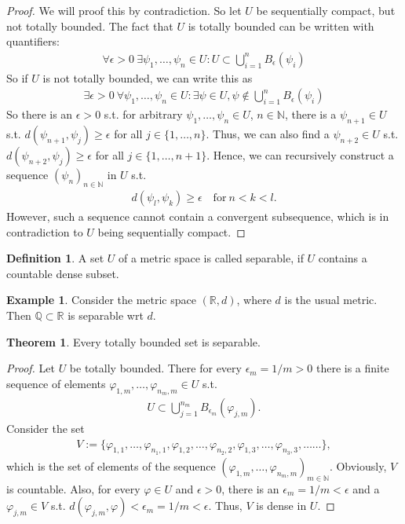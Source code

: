 \documentclass[12pt, a4paper]{article}
\numberwithin{equation}{section}
\theoremstyle{definition}
\theoremstyle{definition}
\newtheorem{defn}[thm]{Definition} %
\newtheorem{exmp}[thm]{Example} %
\newtheorem{theorem}[thm]{Theorem}
\newcommand{\seq}[1][\varphi]{\left( #1 \right)_{n \in \mathbb{N}}}
\begin{document}
	\begin{proof}
		We will proof this by contradiction. So let $U$ be sequentially compact, but not totally bounded. The fact that $U$ is totally bounded can be written with quantifiers:
		\begin{align*}
			\forall \epsilon > 0\ \exists \psi_1, \dots, \psi_n\in U: U\subset \bigcup_{i=1}^{n}B_{\epsilon}(\psi_i)
		\end{align*}
		So if $U$ is not totally bounded, we can write this as 
		\begin{align*}
			\exists\epsilon > 0\ \forall \psi_1, \dots, \psi_n\in U:\exists \psi\in U, \psi\notin\bigcup_{i = 1}^{n}B_{\epsilon}(\psi_i)
		\end{align*}		
		So there is an $\epsilon > 0$ s.t. for arbitrary $\psi_1, \dots, \psi_n\in U$, $n\in\mathbb N$, there is a $\psi_{n+1}\in U$ s.t. $d(\psi_{n+1}, \psi_j) \geq \epsilon$ for all $j\in\{1, \dots, n\}$. Thus, we can also find a $\psi_{n+2}\in U$ s.t. $d(\psi_{n+2}, \psi_j) \geq \epsilon$ for all $j\in \{1, \dots, n+1\}$. Hence, we can recursively construct a sequence $\seq[\psi_n]$ in $U$ s.t.
		\begin{align*}
			d(\psi_l, \psi_k) \geq\epsilon\quad \text{for}\ n < k < l.
		\end{align*}
		However, such a sequence cannot contain a convergent subsequence, which is in contradiction to $U$ being sequentially compact.
	\end{proof}

	\begin{defn}
		A set $U$ of a metric space is called separable, if $U$ contains a countable dense subset.
	\end{defn}

	\begin{exmp}
		Consider the metric space $(\mathbb R, d)$, where $d$ is the usual metric. Then $\mathbb Q\subset\mathbb R$ is separable wrt $d$.
	\end{exmp}

	\begin{theorem}
		Every totally bounded set is separable.
	\end{theorem}

	\begin{proof}
		Let $U$ be totally bounded. There for every $\epsilon_{m} = 1/m > 0$ there is a finite sequence of elements $\varphi_{1, m}, \dots, \varphi_{n_m, m}\in U$ s.t.
		\begin{align*}
			U \subset \bigcup_{j = 1}^{n_m}B_{\epsilon_m}(\varphi_{j, m}).
		\end{align*}
		Consider the set
		\begin{align*}
			V := \{\varphi_{1, 1}, \dots, \varphi_{n_1, 1}, \varphi_{1, 2}, \dots, \varphi_{n_2, 2}, \varphi_{1, 3}, \dots, \varphi_{n_3, 3}, \dots \dots\},
		\end{align*}
		which is the set of elements of the sequence $\left(\varphi_{1, m}, \dots, \varphi_{n_m, m}\right)_{m\in\mathbb N}$. Obviously, $V$ is countable. Also, for every $\varphi\in U$ and $\epsilon > 0$, there is an $\epsilon_m = 1/m < \epsilon$ and a $\varphi_{j, m}\in V$ s.t. $d(\varphi_{j, m}, \varphi) < \epsilon_m = 1/m < \epsilon$. Thus, $V$ is dense in $U$.
	\end{proof}
\end{document}
